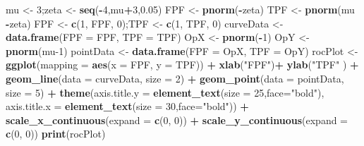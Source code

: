 \documentclass[
]{book}
\newenvironment{Shaded}{\begin{snugshade}}{\end{snugshade}}
\newcommand{\DataTypeTok}[1]{\textcolor[rgb]{0.13,0.29,0.53}{#1}}
\newcommand{\DecValTok}[1]{\textcolor[rgb]{0.00,0.00,0.81}{#1}}
\newcommand{\FloatTok}[1]{\textcolor[rgb]{0.00,0.00,0.81}{#1}}
\newcommand{\KeywordTok}[1]{\textcolor[rgb]{0.13,0.29,0.53}{\textbf{#1}}}
\newcommand{\NormalTok}[1]{#1}
\newcommand{\OperatorTok}[1]{\textcolor[rgb]{0.81,0.36,0.00}{\textbf{#1}}}
\newcommand{\StringTok}[1]{\textcolor[rgb]{0.31,0.60,0.02}{#1}}
\begin{document}
\begin{Shaded}
\begin{Highlighting}[]
\NormalTok{mu \textless{}{-}}\StringTok{ }\DecValTok{3}\NormalTok{;zeta \textless{}{-}}\StringTok{ }\KeywordTok{seq}\NormalTok{(}\OperatorTok{{-}}\DecValTok{4}\NormalTok{,mu}\OperatorTok{+}\DecValTok{3}\NormalTok{,}\FloatTok{0.05}\NormalTok{)}
\NormalTok{FPF \textless{}{-}}\StringTok{ }\KeywordTok{pnorm}\NormalTok{(}\OperatorTok{{-}}\NormalTok{zeta)}
\NormalTok{TPF \textless{}{-}}\StringTok{ }\KeywordTok{pnorm}\NormalTok{(mu }\OperatorTok{{-}}\NormalTok{zeta) }
\NormalTok{FPF \textless{}{-}}\StringTok{ }\KeywordTok{c}\NormalTok{(}\DecValTok{1}\NormalTok{, FPF, }\DecValTok{0}\NormalTok{);TPF \textless{}{-}}\StringTok{ }\KeywordTok{c}\NormalTok{(}\DecValTok{1}\NormalTok{, TPF, }\DecValTok{0}\NormalTok{)}
\NormalTok{curveData \textless{}{-}}\StringTok{ }\KeywordTok{data.frame}\NormalTok{(}\DataTypeTok{FPF =}\NormalTok{ FPF, }\DataTypeTok{TPF =}\NormalTok{ TPF)}
\NormalTok{OpX \textless{}{-}}\StringTok{ }\KeywordTok{pnorm}\NormalTok{(}\OperatorTok{{-}}\DecValTok{1}\NormalTok{)}
\NormalTok{OpY \textless{}{-}}\StringTok{ }\KeywordTok{pnorm}\NormalTok{(mu}\DecValTok{{-}1}\NormalTok{)}
\NormalTok{pointData \textless{}{-}}\StringTok{ }\KeywordTok{data.frame}\NormalTok{(}\DataTypeTok{FPF =}\NormalTok{ OpX, }\DataTypeTok{TPF =}\NormalTok{ OpY)}
\NormalTok{rocPlot \textless{}{-}}\StringTok{ }\KeywordTok{ggplot}\NormalTok{(}\DataTypeTok{mapping =} \KeywordTok{aes}\NormalTok{(}\DataTypeTok{x =}\NormalTok{ FPF, }\DataTypeTok{y =}\NormalTok{ TPF)) }\OperatorTok{+}\StringTok{ }\KeywordTok{xlab}\NormalTok{(}\StringTok{"FPF"}\NormalTok{)}\OperatorTok{+}\StringTok{ }\KeywordTok{ylab}\NormalTok{(}\StringTok{"TPF"}\NormalTok{ ) }\OperatorTok{+}\StringTok{ }
\StringTok{  }\KeywordTok{geom\_line}\NormalTok{(}\DataTypeTok{data =}\NormalTok{ curveData, }\DataTypeTok{size =} \DecValTok{2}\NormalTok{) }\OperatorTok{+}\StringTok{ }\KeywordTok{geom\_point}\NormalTok{(}\DataTypeTok{data =}\NormalTok{ pointData, }\DataTypeTok{size =} \DecValTok{5}\NormalTok{) }\OperatorTok{+}
\StringTok{  }\KeywordTok{theme}\NormalTok{(}\DataTypeTok{axis.title.y =} \KeywordTok{element\_text}\NormalTok{(}\DataTypeTok{size =} \DecValTok{25}\NormalTok{,}\DataTypeTok{face=}\StringTok{"bold"}\NormalTok{),}
        \DataTypeTok{axis.title.x =} \KeywordTok{element\_text}\NormalTok{(}\DataTypeTok{size =} \DecValTok{30}\NormalTok{,}\DataTypeTok{face=}\StringTok{"bold"}\NormalTok{))  }\OperatorTok{+}
\StringTok{  }\KeywordTok{scale\_x\_continuous}\NormalTok{(}\DataTypeTok{expand =} \KeywordTok{c}\NormalTok{(}\DecValTok{0}\NormalTok{, }\DecValTok{0}\NormalTok{)) }\OperatorTok{+}\StringTok{ }
\StringTok{  }\KeywordTok{scale\_y\_continuous}\NormalTok{(}\DataTypeTok{expand =} \KeywordTok{c}\NormalTok{(}\DecValTok{0}\NormalTok{, }\DecValTok{0}\NormalTok{)) }
\KeywordTok{print}\NormalTok{(rocPlot)}
\end{Highlighting}
\end{Shaded}
\end{document}
